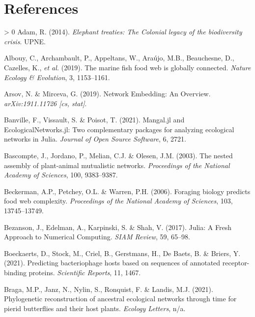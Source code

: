 \documentclass[11pt]{article}
\newlength{\cslhangindent}
\newenvironment{CSLReferences}[3] %
 {%
  \setlength{\parindent}{0pt}
  \ifodd #1 \everypar{\setlength{\hangindent}{\cslhangindent}}\ignorespaces\fi
  \ifnum #2 > 0
  \setlength{\parskip}{#2\baselineskip}
  \fi
 }%
 {}
\begin{document}
\hypertarget{references}{%
\section*{References}\label{references}}

\hypertarget{refs}{}
\begin{CSLReferences}{1}{0}
\leavevmode\hypertarget{ref-Adam2014EleTre}{}%
Adam, R. (2014). \emph{Elephant treaties: The Colonial legacy of the
biodiversity crisis}. UPNE.

\leavevmode\hypertarget{ref-Albouy2019MarFis}{}%
Albouy, C., Archambault, P., Appeltans, W., Araújo, M.B., Beauchesne,
D., Cazelles, K., \emph{et al.} (2019). The marine fish food web is
globally connected. \emph{Nature Ecology \& Evolution}, 3, 1153--1161.

\leavevmode\hypertarget{ref-Arsov2019NetEmb}{}%
Arsov, N. \& Mirceva, G. (2019). Network Embedding: An Overview.
\emph{arXiv:1911.11726 {[}cs, stat{]}}.

\leavevmode\hypertarget{ref-Banville2021ManJl}{}%
Banville, F., Vissault, S. \& Poisot, T. (2021). Mangal.jl and
EcologicalNetworks.jl: Two complementary packages for analyzing
ecological networks in Julia. \emph{Journal of Open Source Software}, 6,
2721.

\leavevmode\hypertarget{ref-Bascompte2003NesAss}{}%
Bascompte, J., Jordano, P., Melian, C.J. \& Olesen, J.M. (2003). The
nested assembly of plant-animal mutualistic networks. \emph{Proceedings
of the National Academy of Sciences}, 100, 9383--9387.

\leavevmode\hypertarget{ref-Beckerman2006ForBio}{}%
Beckerman, A.P., Petchey, O.L. \& Warren, P.H. (2006). Foraging biology
predicts food web complexity. \emph{Proceedings of the National Academy
of Sciences}, 103, 13745--13749.

\leavevmode\hypertarget{ref-Bezanson2017JulFre}{}%
Bezanson, J., Edelman, A., Karpinski, S. \& Shah, V. (2017). Julia: A
Fresh Approach to Numerical Computing. \emph{SIAM Review}, 59, 65--98.

\leavevmode\hypertarget{ref-Boeckaerts2021PreBac}{}%
Boeckaerts, D., Stock, M., Criel, B., Gerstmans, H., De Baets, B. \&
Briers, Y. (2021). Predicting bacteriophage hosts based on sequences of
annotated receptor-binding proteins. \emph{Scientific Reports}, 11,
1467.

\leavevmode\hypertarget{ref-Braga2021PhyRec}{}%
Braga, M.P., Janz, N., Nylin, S., Ronquist, F. \& Landis, M.J. (2021).
Phylogenetic reconstruction of ancestral ecological networks through
time for pierid butterflies and their host plants. \emph{Ecology
Letters}, n/a.


\end{CSLReferences}
\end{document}
